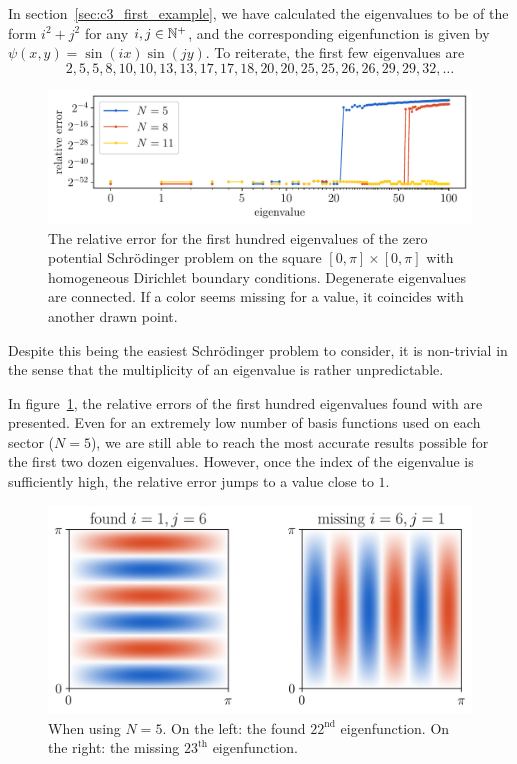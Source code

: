 In section~\ref{sec:c3_first_example}, we have calculated the eigenvalues to be of the form $i^2 + j^2$ for any $i, j \in \mathbb{N}^+$, and the corresponding eigenfunction is given by $ \psi(x, y) = \sin(ix)\sin(jy)$. To reiterate, the first few eigenvalues are
$$
  2, 5, 5, 8, 10, 10, 13, 13, 17, 17, 18, 20, 20, 25, 25, 26, 26, 29, 29, 32, \dots
$$

\begin{figure}
  \begin{center}
    \includegraphics[width=\textwidth]{img/chapter3/experiments/zero.pdf}
  \end{center}
  \caption{The relative error for the first hundred eigenvalues of the zero potential Schrödinger problem on the square $[0, \pi] \times [0, \pi]$ with homogeneous Dirichlet boundary conditions. Degenerate eigenvalues are connected. If a color seems missing for a value, it coincides with another drawn point.}\label{fig:c3_experiment_zero}
\end{figure}

Despite this being the easiest Schrödinger problem to consider, it is non-trivial in the sense that the multiplicity of an eigenvalue is rather unpredictable.

In figure~\ref{fig:c3_experiment_zero}, the relative errors of the first hundred eigenvalues found with \pyslisetd{} are presented. Even for an extremely low number of basis functions used on each sector ($N = 5$), we are still able to reach the most accurate results possible for the first two dozen eigenvalues. However, once the index of the eigenvalue is sufficiently high, the relative error jumps to a value close to $1$.

\begin{figure}
  \begin{center}
    \includegraphics[width=\textwidth]{img/chapter3/experiments/zero_missing.png}
  \end{center}
  \caption{When using $N = 5$. On the left: the found $22^\text{nd}$ eigenfunction. On the right: the missing $23^\text{th}$ eigenfunction.}\label{fig:c3_experiment_zero_missing}
\end{figure}

